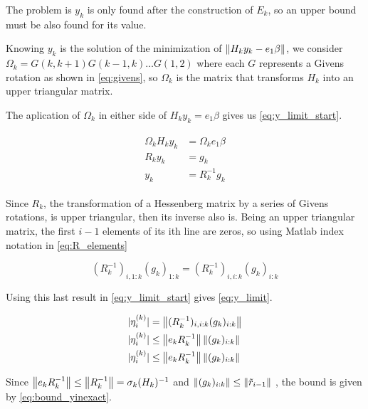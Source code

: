 The problem is $y_{k}$ is only found after the construction of $E_{k}$, so an upper bound must be also found for its value.

Knowing $y_{k}$ is the solution of the minimization of $ \left\lVert H_{k}y_{k} - e_{1}\beta\right\rVert $, we consider $\Omega_{k} =G(k,k+1) G(k-1,k) \dots G(1,2)$ where each $G$ represents a Givens rotation as shown in \ref{eq:givens}, so $\Omega_{k}$ is the matrix that transforms $H_{k}$ into an upper triangular matrix.

The aplication of $\Omega_{k}$ in either side of $H_{k}y_{k}  = e_{1}\beta$ gives us \ref{eq:y_limit_start}.

\begin{align}\label{eq:y_limit_start}
    \begin{split}
        \Omega_{k}H_{k}y_{k}&=\Omega_{k}e_{1}\beta\\
        R_{k}y_{k}&=g_{k}\\
        y_{k}&=R^{-1}_{k}g_{k}
    \end{split}
\end{align}

Since $R_{k}$, the transformation of a Hessenberg matrix by a series of Givens rotations, is upper triangular, then its inverse also is.
Being an upper triangular matrix, the first $i-1$ elements of its ith line are zeros, so using Matlab index notation in \ref{eq:R_elements}

\begin{equation}\label{eq:R_elements}
    (R^{-1}_{k})_{i,1:k}(g_{k})_{1:k} = (R^{-1}_{k})_{i,i:k}(g_{k})_{i:k}
\end{equation}

Using this last result in \ref{eq:y_limit_start} gives \ref{eq:y_limit}.

\begin{align}\label{eq:y_limit}
    \begin{split}
        |\eta^{(k)}_{i}| &= \left\lVert(R^{-1}_{k})_{i,i:k}(g_{k})_{i:k}\right\rVert\\
        |\eta^{(k)}_{i}| &\leq \left\lVert e_{k}R^{-1}_{k}\right\rVert \left\lVert(g_{k})_{i:k}\right\rVert\\
        |\eta^{(k)}_{i}| &\leq \left\lVert e_{k}R^{-1}_{k}\right\rVert \left\lVert(g_{k})_{i:k}\right\rVert\\
    \end{split}
\end{align}

Since $\left\lVert e_{k}R^{-1}_{k}\right\rVert \leq \left\lVert R^{-1}_{k}\right\rVert = \sigma_{k}(H_{k})^{-1}$ and $\left\lVert(g_{k})_{i:k}\right\rVert \leq \left\lVert\tilde{r}_{i-1}\right\rVert$ \cite{simoncini2003theory}, the bound is given by \ref{eq:bound_yinexact}.

